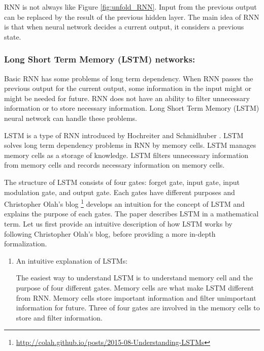 \documentclass[draft,dvipsnames]{drexel-thesis}
\begin{document}
\begin{thesis}
	RNN is not always like Figure \ref{fig:unfold_RNN}. Input from the previous output can be replaced by the result of the previous hidden layer. The main idea of RNN is that when neural network decides a current output, it considers a previous state.


\subsubsection{Long Short Term Memory (LSTM) networks:}\label{LSTM}
	Basic RNN has some problems of long term dependency. When RNN passes the previous output for the current output, some information in the input might or might be needed for future. RNN does not have an ability to filter unnecessary information or to store necessary information. Long Short Term Memory (LSTM) neural network can handle these problems.

	LSTM is a type of RNN introduced by Hochreiter and Schmidhuber \cite{hochreiter1997long}. LSTM solves long term dependency problems in RNN by memory cells. LSTM manages memory cells as a storage of knowledge. LSTM filters unnecessary information from memory cells and records necessary information on memory cells.

	The structure of LSTM consists of four gates: forget gate, input gate, input modulation gate, and output gate. Each gates have different purposes and Christopher Olah's blog \footnote{\url{http://colah.github.io/posts/2015-08-Understanding-LSTMs}} develops an intuition for the concept of LSTM and explains the purpose of each gates. The paper \cite{zaremba2014recurrent}  describes LSTM in a mathematical term. Let us first provide an intuitive description of how LSTM works by following Christopher Olah's blog, before providing a more in-depth formalization.



\begin{enumerate}
\item An intuitive explanation of LSTMs:

	The easiest way to understand LSTM is to understand memory cell and the purpose of four different gates. Memory cells are what make LSTM different from RNN. Memory cells store important information and filter unimportant information for future. Three of four gates are involved in the memory cells to store and filter information.


\end{enumerate}
\end{thesis}
\end{document}
